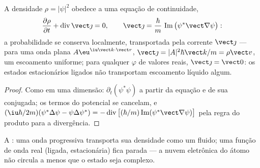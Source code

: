 \begin{proposition}\label{prop:b3:schrodinger-three-dimensions:current}
A densidade $\rho = |\psi|^2$ obedece a uma equação de continuidade,
\[
\frac{\partial\rho}{\partial t} + \operatorname{div}\vect\jmath = 0 ,
\qquad
\vect\jmath = \frac{\hbar}{m}\,
\operatorname{Im}\big(\psi^*\vect\nabla\psi\big) :
\]
a probabilidade se conserva localmente, transportada pela corrente
$\vect\jmath$ --- para uma onda plana $A\eu^{\iu\vect k\cdot\vect r}$,
$\vect\jmath = |A|^2\hbar\vect k/m = \rho\vect v$, um escoamento
uniforme; para qualquer $\varphi$ de valores reais,
$\vect\jmath = \vect 0$: os estados estacionários ligados não
transportam escoamento líquido algum.
\end{proposition}

\begin{proof}
Como em uma dimensão: $\partial_t(\psi^*\psi)$ a partir da equação e
de sua conjugada; os termos do potencial se cancelam, e $(\iu\hbar/2m)
(\psi^*\Delta\psi - \psi\Delta\psi^*) =
-\operatorname{div}\big[(\hbar/m)\operatorname{Im}(\psi^*\vect\nabla
\psi)\big]$ pela regra do produto para a divergência.
\end{proof}

\begin{omfigure}

{\small A : uma onda progressiva transporta
sua densidade como um fluido; uma função de onda real (ligada,
estacionária) fica parada --- a nuvem eletrônica do átomo não circula a
menos que o estado seja complexo.}
\end{omfigure}

